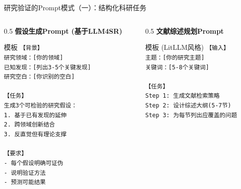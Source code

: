 \documentclass[aspectratio=169,11pt]{beamer}
\begin{document}
\begin{frame}[fragile]{研究验证的Prompt模式（一）：结构化科研任务}
    \begin{columns}
        \begin{column}{0.5\textwidth}
            \textbf{假设生成Prompt (基于LLM4SR)}
            \begin{exampleblock}{模板}
                \scriptsize
                \texttt{【背景】}\\
                \texttt{研究领域：[你的领域]}\\
                \texttt{已知发现：[列出3-5个关键发现]}\\
                \texttt{研究空白：[你识别的空白]}\\
                \texttt{}\\
                \texttt{【任务】}\\
                \texttt{生成3个可检验的研究假设：}\\
                \texttt{1. 基于已有发现的延伸}\\
                \texttt{2. 跨领域创新结合}\\
                \texttt{3. 反直觉但有理论支撑}\\
                \texttt{}\\
                \texttt{【要求】}\\
                \texttt{- 每个假设明确可证伪}\\
                \texttt{- 说明验证方法}\\
                \texttt{- 预测可能结果}
            \end{exampleblock}
        \end{column}
        \begin{column}{0.5\textwidth}
            \textbf{文献综述规划Prompt}
            \begin{exampleblock}{模板 (LitLLM风格)}
                \scriptsize
                \texttt{【输入】}\\
                \texttt{主题：[你的研究主题]}\\
                \texttt{关键词：[5-8个关键词]}\\
                \texttt{}\\
                \texttt{【任务】}\\
                \texttt{Step 1: 生成文献检索策略}\\
                \texttt{Step 2: 设计综述大纲(5-7节)}\\
                \texttt{Step 3: 为每节列出应覆盖的问题}\\

\end{exampleblock}
\end{column}
\end{columns}
\end{frame}
\end{document}
